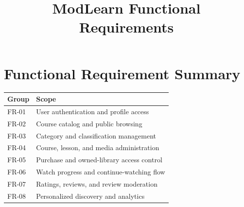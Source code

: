 \documentclass[11pt,a4paper]{article}
\title{\textbf{ModLearn Functional Requirements}}
\author{}
\begin{document}
\maketitle

\section*{Functional Requirement Summary}
\begin{tabularx}{\textwidth}{L{2.2cm}Y}
\toprule
\textbf{Group} & \textbf{Scope} \\
\midrule
FR-01 & User authentication and profile access \\
FR-02 & Course catalog and public browsing \\
FR-03 & Category and classification management \\
FR-04 & Course, lesson, and media administration \\
FR-05 & Purchase and owned-library access control \\
FR-06 & Watch progress and continue-watching flow \\
FR-07 & Ratings, reviews, and review moderation \\
FR-08 & Personalized discovery and analytics \\
\bottomrule
\end{tabularx}
\end{document}
